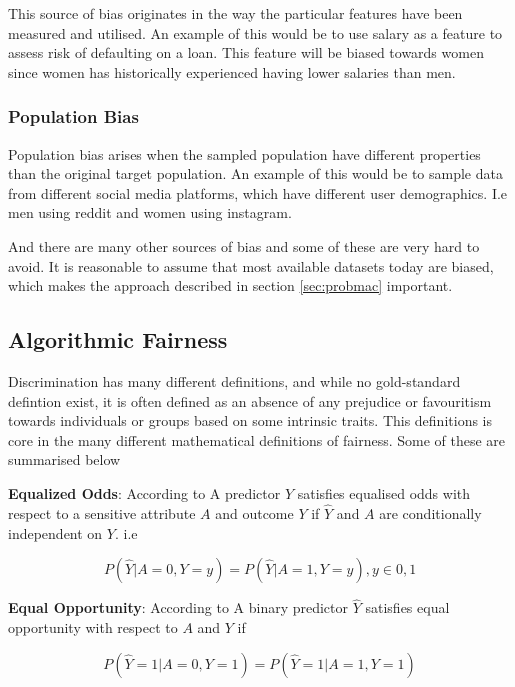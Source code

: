 {This source of bias originates in the way the particular features have been measured and utilised. \cite{suresh2019framework} An example of this would be to use salary as a feature to assess risk of defaulting on a loan. This feature will be biased towards women since women has historically experienced having lower salaries than men.

\subsubsection{Population Bias}

Population bias arises when the sampled population have different properties than the original target population. \cite{olteanu2019social} An example of this would be to sample data from different social media platforms, which have different user demographics. I.e men using reddit and women using instagram.

And there are many other sources of bias and some of these are very hard to avoid. It is reasonable to assume that most available datasets today are biased, which makes the approach described in section \ref{sec:probmac} important.

\subsection{Algorithmic Fairness}

Discrimination has many different definitions, and while no gold-standard defintion exist, it is often defined as an absence of any prejudice or favouritism towards individuals or groups based on some intrinsic traits. \cite{mehrabi2021survey, nripsuta2019} This definitions is core in the many different mathematical definitions of fairness. Some of these are summarised below

\textbf{Equalized Odds}: According to \citet{mehrabi2021survey, hardt2016} A predictor $\hat{Y}$ satisfies equalised odds with respect to a sensitive attribute $A$ and outcome $Y$ if $\hat{Y}$ and $A$ are conditionally independent on $Y$. i.e

\begin{equation}
    P(\hat{Y}|A=0, Y=y) = P(\hat{Y}|A=1, Y=y), y \in {0, 1}
\end{equation}

\textbf{Equal Opportunity}: According to \citet{mehrabi2021survey, hardt2016} A binary predictor $\hat{Y}$ satisfies equal opportunity with respect to $A$ and $Y$ if

\begin{equation}
    P(\hat{Y}=1|A=0, Y=1) = P(\hat{Y}=1|A=1, Y=1)
\end{equation}

}
